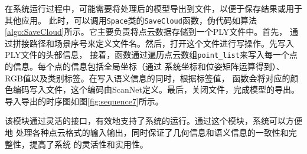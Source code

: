 \par 在系统运行过程中，可能需要将处理后的模型导出到文件，以便于保存结果或用于其他应用。
此时，可以调用\texttt{Space}类的\texttt{SaveCloud}函数，伪代码如算法\ref{algo:SaveCloud}所示。它主要负责将点云数据存储到一个PLY文件中。首先，
通过拼接路径和场景序号来定义文件名。然后，打开这个文件进行写操作。先写入PLY文件的头部信息，
接着，函数通过遍历点云数组\texttt{point\_list}来写入每一个点的信息。每个点的信息包括全局坐标（通过
系统坐标和位姿矩阵运算得到）、RGB值以及类别标签。在写入语义信息的同时，根据标签值，
函数会将对应的颜色编码写入文件，这个编码由ScanNet定义。最后，关闭文件，完成模型的导出。导入导出的时序图如图\ref{fig:sequence7}所示。

\par 该模块通过灵活的接口，有效地支持了系统的运行。通过这个模块，系统可以方便地
处理各种点云格式的输入输出，同时保证了几何信息和语义信息的一致性和完整性，提高了系统
的灵活性和实用性。